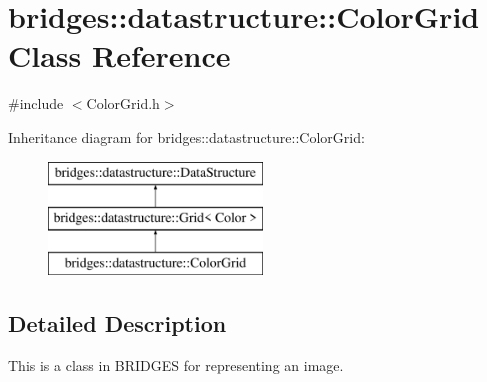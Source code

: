 \hypertarget{classbridges_1_1datastructure_1_1_color_grid}{}\section{bridges\+::datastructure\+::Color\+Grid Class Reference}
\label{classbridges_1_1datastructure_1_1_color_grid}


{\ttfamily \#include $<$Color\+Grid.\+h$>$}

Inheritance diagram for bridges\+::datastructure\+::Color\+Grid\+:\begin{figure}[H]
\begin{center}
\leavevmode
\includegraphics[height=3.000000cm]{classbridges_1_1datastructure_1_1_color_grid}
\end{center}
\end{figure}


\subsection{Detailed Description}
This is a class in B\+R\+I\+D\+G\+ES for representing an image. 

